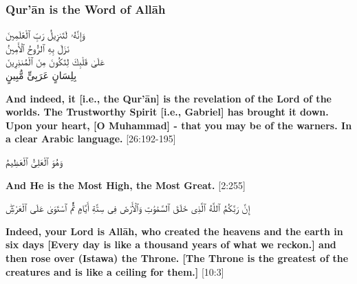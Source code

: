 \subsubsection*{Qur'\=an is the Word of All\=ah}
\begin{center}
    \begin{RLtext}
        وَإِنَّهُۥ لَتَنزِيلُ رَبِّ ٱلْعَٰلَمِينَ \\
        نَزَلَ بِهِ ٱلرُّوحُ ٱلْأَمِينُ \\
        عَلَىٰ قَلْبِكَ لِتَكُونَ مِنَ ٱلْمُنذِرِينَ \\
        بِلِسَانٍ عَرَبِىٍّ مُّبِينٍ 
    \end{RLtext}
\end{center}
\textbf{And indeed, it [i.e., the Qur’\=an] is the revelation of the Lord of the worlds. The Trustworthy Spirit [i.e., Gabriel] has brought it down. Upon your heart, [O Muhammad] - that you may be of the warners. In a clear Arabic language.} [26:192-195]

\begin{center}
    \begin{RLtext}
        وَهُوَ ٱلْعَلِىُّ ٱلْعَظِيمُ
    \end{RLtext}
    \textbf{And He is the Most High, the Most Great.} [2:255]
\end{center}

\begin{center}
    \begin{RLtext}
        إِنَّ رَبَّكُمُ ٱللَّهُ ٱلَّذِى خَلَقَ ٱلسَّمَٰوَٰتِ وَٱلْأَرْضَ فِى سِتَّةِ أَيَّامٍ ثُمَّ ٱسْتَوَىٰ عَلَى ٱلْعَرْشِۖ 

    \end{RLtext}
\end{center}
\textbf{Indeed, your Lord is Allāh, who created the heavens and the earth in six days [Every day is like a thousand years of what we reckon.] and then rose over (Istawa) the Throne. [The Throne is the greatest of the creatures and is like a ceiling for them.]} [10:3]

